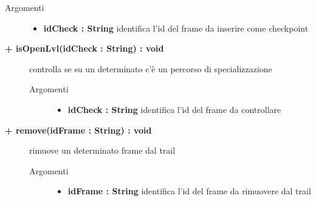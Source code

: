 \begin{description}
\begin{description}
		\begin{description}
			\item[Argomenti] \hfill
				\begin{itemize}
				
					\item \textbf{idCheck : String			} \hfill
						identifica l'id del frame da inserire come checkpoint
					
				\end{itemize}
		\end{description}
	\end{description}
	
	\begin{description}
		\item[\textbf{\color{blue}+ isOpenLvl(idCheck : String) : void			}] \hfill
			controlla se su un determinato c'è un percorso di specializzazione
			
		\begin{description}
			\item[Argomenti] \hfill
				\begin{itemize}
				
					\item \textbf{idCheck : String			} \hfill
						identifica l'id del frame da controllare
					
				\end{itemize}
		\end{description}
	\end{description}
	
		
	
	\begin{description}
		\item[\textbf{\color{blue}+ remove(idFrame : String) : void			}] \hfill
			rimuove un determinato frame dal trail
			
		\begin{description}
			\item[Argomenti] \hfill
				\begin{itemize}
				
					\item \textbf{idFrame : String			} \hfill
						identifica l'id del frame da rimuovere dal trail
					
				\end{itemize}
		\end{description}
	\end{description}
	

\end{description}
